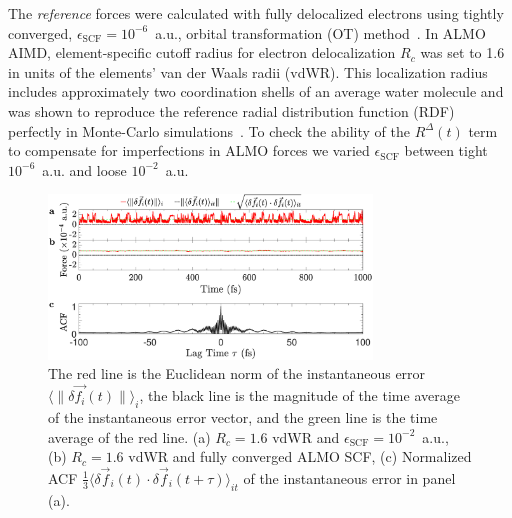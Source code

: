 \documentclass[aps,prl,reprint,amsmath,amssymb]{revtex4-1}
\begin{document}
The \emph{reference} forces were calculated with fully delocalized electrons using tightly converged, $\epsilon_{\text{SCF}}=10^{-6}$~a.u., orbital transformation (OT) method~\cite{a:ot}. 
In ALMO AIMD, element-specific cutoff radius for electron delocalization $R_c$ was set to 1.6 in units of the elements' van der Waals radii (vdWR). This localization radius includes approximately two coordination shells of an average water molecule and was shown to reproduce the reference radial distribution function (RDF) perfectly in Monte-Carlo simulations~\cite{a:almo-ls}. 
%
To check the ability of the $R^{\Delta}(t)$ term to compensate for imperfections in ALMO forces we varied $\epsilon_{\text{SCF}}$ between tight $10^{-6}$~a.u. and loose $10^{-2}$~a.u. 

\begin{figure}
\includegraphics[trim={0.5cm 0cm 0.7cm 0.1cm},clip,width=8.6cm]{DeltaForceComparison_with_ACF.eps}
\caption{\label{fig:randomforce} 
The red line is the Euclidean norm of the instantaneous error $\langle \| \delta \vec{f_{i}}(t) \| \rangle_{i}$, the black line is the magnitude of the time average of the instantaneous error vector, and the green line is the time average of the red line. 
(a) $R_{c} = 1.6$ vdWR and $\epsilon_{\text{SCF}} = 10^{-2}$~a.u., 
(b) $R_{c} = 1.6$ vdWR and fully converged ALMO SCF, 
(c) Normalized ACF $\frac{1}{3}\langle \delta \vec{f}_i (t) \cdot \delta\vec{f}_i(t+\tau) \rangle_{it}$ of the instantaneous error in panel (a).
}
\end{figure}
\end{document}
